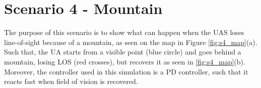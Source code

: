 \newpage
\section{Scenario 4 - Mountain}\label{sec:scenario4}
The purpose of this scenario is to show what can happen when the UAS loses line-of-sight because of a mountain, as seen on the map in Figure \ref{fig:s4_map}(a). Such that, the UA starts from a visible point (blue circle) and goes behind a mountain, losing LOS (red crosses), but recovers it as seen in \ref{fig:s4_map}(b). Moreover, the controller used in this simulation is a PD controller, such that it reacts fast when field of vision is recovered.

\begin{figure}[H]
	\centering

\end{figure}
